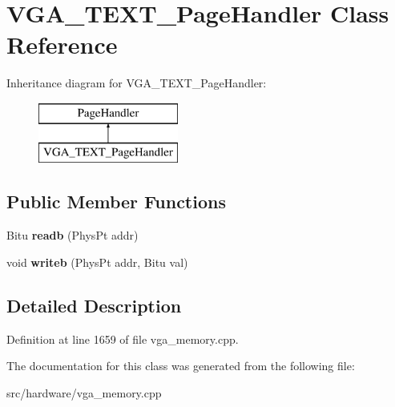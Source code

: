 \hypertarget{classVGA__TEXT__PageHandler}{\section{V\-G\-A\-\_\-\-T\-E\-X\-T\-\_\-\-Page\-Handler Class Reference}
\label{classVGA__TEXT__PageHandler}
}
Inheritance diagram for V\-G\-A\-\_\-\-T\-E\-X\-T\-\_\-\-Page\-Handler\-:\begin{figure}[H]
\begin{center}
\leavevmode
\includegraphics[height=2.000000cm]{classVGA__TEXT__PageHandler}
\end{center}
\end{figure}
\subsection*{Public Member Functions}
\begin{DoxyCompactItemize}
\item 
\hypertarget{classVGA__TEXT__PageHandler_a1db1f4c74e3117342a06f43326d94ce4}{Bitu {\bfseries readb} (Phys\-Pt addr)}\label{classVGA__TEXT__PageHandler_a1db1f4c74e3117342a06f43326d94ce4}

\item 
\hypertarget{classVGA__TEXT__PageHandler_a7615ff08d8fef7047adb7e2176561829}{void {\bfseries writeb} (Phys\-Pt addr, Bitu val)}\label{classVGA__TEXT__PageHandler_a7615ff08d8fef7047adb7e2176561829}

\end{DoxyCompactItemize}


\subsection{Detailed Description}


Definition at line 1659 of file vga\-\_\-memory.\-cpp.



The documentation for this class was generated from the following file\-:\begin{DoxyCompactItemize}
\item 
src/hardware/vga\-\_\-memory.\-cpp\end{DoxyCompactItemize}
